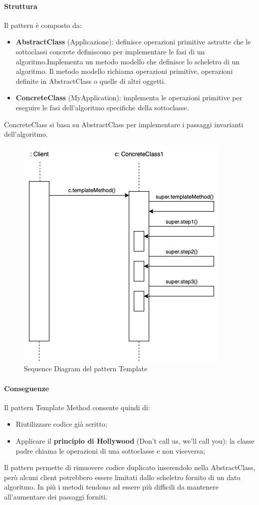 \paragraph{Struttura} Il pattern è composto da:
\begin{itemize}
    \item \textbf{AbstractClass} (Applicazione): definisce operazioni primitive astratte che le sottoclassi concrete definiscono per implementare le fasi di un algoritmo.Implementa un metodo modello che definisce lo scheletro di un algoritmo. Il metodo modello richiama operazioni primitive, operazioni definite in AbstractClass o quelle di altri oggetti.
    \item \textbf{ConcreteClass} (MyApplication): implementa le operazioni primitive per eseguire le fasi dell'algoritmo specifiche della sottoclasse.
\end{itemize}

ConcreteClass si basa su AbstractClass per implementare i passaggi invarianti dell'algoritmo.

\begin{figure}[H]
    \centering
    \includegraphics[width=0.5\linewidth]{assets/pattern/template-method/template-sequence.drawio.png}
    \caption{Sequence Diagram del pattern Template}
\end{figure}

\paragraph{Conseguenze} Il pattern Template Method consente quindi di:
\begin{itemize}
    \item Riutilizzare codice già scritto;
    \item Applicare il \textbf{principio di Hollywood} (Don't call us, we'll call you): la classe padre chiama le operazioni di una sottoclasse e non viceversa;
\end{itemize}

Il pattern permette di rimuovere codice duplicato inserendolo nella AbstractClass, però alcuni client potrebbero essere limitati dallo scheletro fornito di un dato algoritmo. In più i metodi tendono ad essere più difficili da mantenere all'aumentare dei passaggi forniti.



\newpage